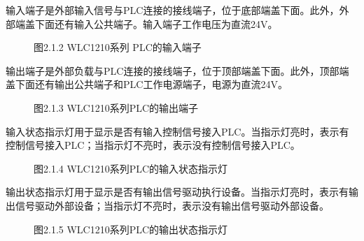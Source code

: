 \documentclass[a4paper,10pt,english]{sphinxmanual}
\begin{document}
\sphinxAtStartPar
{}

\sphinxAtStartPar
输入端子是外部输入信号与PLC连接的接线端子，位于底部端盖下面。此外，外部端盖下面还有输入公共端子。输入端子工作电压为直流24V。

\begin{figure}[htbp]
\centering
\capstart

\noindent{}
\caption{图2.1.2  WLC\sphinxhyphen{}1210系列 PLC的输入端子}\label{\detokenize{Product_Overview:id5}}\end{figure}

\sphinxAtStartPar
{}

\sphinxAtStartPar
输出端子是外部负载与PLC连接的接线端子，位于顶部端盖下面。此外，顶部端盖下面还有输出公共端子和PLC工作电源端子，电源为直流24V。

\begin{figure}[htbp]
\centering
\capstart

\noindent{}
\caption{图2.1.3  WLC\sphinxhyphen{}1210系列PLC的输出端子}\label{\detokenize{Product_Overview:id6}}\end{figure}

\sphinxAtStartPar
{}

\sphinxAtStartPar
输入状态指示灯用于显示是否有输入控制信号接入PLC。当指示灯亮时，表示有控制信号接入PLC；当指示灯不亮时，表示没有控制信号接入PLC。

\begin{figure}[htbp]
\centering
\capstart

\noindent{}
\caption{图2.1.4  WLC\sphinxhyphen{}1210系列PLC的输入状态指示灯}\label{\detokenize{Product_Overview:id7}}\end{figure}

\sphinxAtStartPar
{}

\sphinxAtStartPar
输出状态指示灯用于显示是否有输出信号驱动执行设备。当指示灯亮时，表示有输出信号驱动外部设备；当指示灯不亮时，表示没有输出信号驱动外部设备。

\begin{figure}[htbp]
\centering
\capstart

\noindent{}
\caption{图2.1.5  WLC\sphinxhyphen{}1210系列PLC的输出状态指示灯}\label{\detokenize{Product_Overview:id8}}\end{figure}
\end{document}
